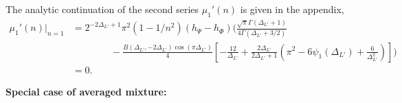 \documentclass[11pt]{article}
\newcommand{\nn}{\nonumber}
\newcommand{\lb}{\left(}
\newcommand{\rb}{\right)}
\begin{document}
The analytic continuation of the second series $\mu_1'(n)$ is given in the appendix,
\begin{align}
    \mu_1'(n)\big|_{n=1} &= 2^{-2\Delta_{L'}+1}\pi^2(1-1/n^2)(h_\Psi - h_\Phi) \Bigg(\frac{\sqrt{\pi}\Gamma(\Delta_{L'}+1)}{4\Gamma(\Delta_{L'}+3/2)} \nn  \\
    &\qquad\qquad
    -\frac{ B(\Delta_{L'},-2\Delta_{L'})\cos(\pi \Delta_{L'})}{4}\left[ -\frac{12}{\Delta_{L'}} + \frac{2\Delta_{L'} }{2\Delta_{L'} + 1} \lb \pi^2 -6\psi_1(\Delta_{L'}) + \frac{6}{\Delta_{L'}^2} \rb  \right]
    \Bigg) \\
    & = 0.
\end{align}

\textbf{Special case of averaged mixture:}
\end{document}

